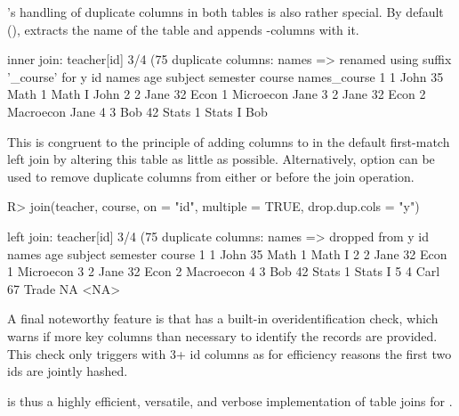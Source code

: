 \documentclass[article]{jss} %
\newcommand{\fct}[1]{\code{#1()}}
\begin{document}
\newpage
\fct{join}'s handling of duplicate columns in both tables is also rather special. By default (), \fct{join} extracts the name of the  table and appends -columns with it. %
%
\begin{Schunk}
\begin{Soutput}
inner join: teacher[id] 3/4 (75%) <1:1.33> course[id] 4/5 (80%)
duplicate columns: names => renamed using suffix '_course' for y
  id names age subject semester    course names_course
1  1  John  35    Math        1    Math I         John
2  2  Jane  32    Econ        1 Microecon         Jane
3  2  Jane  32    Econ        2 Macroecon         Jane
4  3   Bob  42   Stats        1   Stats I          Bob
\end{Soutput}
\end{Schunk}
%
This is congruent to the principle of adding columns to  in the default first-match left join by altering this table as little as possible. Alternatively, option  can be used to remove duplicate columns from either  or  before the join operation.
%
\begin{Schunk}
\begin{Sinput}
R> join(teacher, course, on = "id", multiple = TRUE, drop.dup.cols = "y")
\end{Sinput}
\begin{Soutput}
left join: teacher[id] 3/4 (75%) <1:1.33> course[id] 4/5 (80%)
duplicate columns: names => dropped from y
  id names age subject semester    course
1  1  John  35    Math        1    Math I
2  2  Jane  32    Econ        1 Microecon
3  2  Jane  32    Econ        2 Macroecon
4  3   Bob  42   Stats        1   Stats I
5  4  Carl  67   Trade       NA      <NA>
\end{Soutput}
\end{Schunk}
%
A final noteworthy feature is that \fct{fmatch} has a built-in overidentification check, which warns if more key columns than necessary to identify the records are provided. This check only triggers with 3+ id columns as for efficiency reasons the first two ids are jointly hashed.

\fct{join} is thus a highly efficient, versatile, and verbose implementation of table joins for .
%
\end{document}

